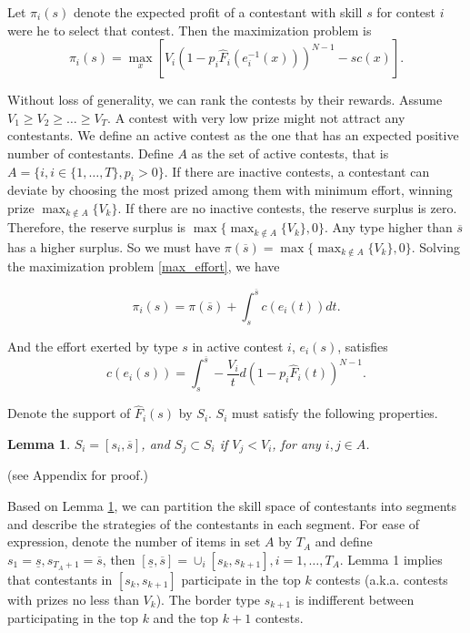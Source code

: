 \documentclass[12pt]{article}
\newtheorem{Lemma}{Lemma}
\begin{document}
Let $\pi_{i}(s)$ denote the expected profit of a contestant with
skill $s$ for contest $i$ were he to select that contest. Then the
maximization problem is
\begin{equation}
\pi_{i}(s)=\max_{x}[V_{i}(1-p_{i}\hat{F}_{i}(e_{i}^{-1}(x)))^{N-1}-sc(x)].\label{max_effort}
\end{equation}


Without loss of generality, we can rank the contests by their rewards.
Assume $V_{1}\geq V_{2}\geq\dots\geq V_{T}$. A contest with very
low prize might not attract any contestants. We define an active contest
as the one that has an expected positive number of contestants. Define
$A$ as the set of active contests, that is $A=\{i,i\in\{1,\dots,T\},p_{i}>0\}$.
If there are inactive contests, a contestant can deviate by choosing
the most prized among them with minimum effort, winning prize $\max_{k\not\in A}\{V_{k}\}$.
If there are no inactive contests, the reserve surplus is zero. Therefore,
the reserve surplus is $\max\{\max_{k\not\in A}\{V_{k}\},0\}$. Any
type higher than $\overline{s}$ has a higher surplus. So we must
have $\pi(\overline{s})=\max\{\max_{k\not\in A}\{V_{k}\},0\}$. Solving
the maximization problem \ref{max_effort}, we have

\begin{equation}
\pi_{i}(s)=\pi(\overline{s})+\int_{s}^{\overline{s}}c(e_{i}(t))dt.\label{profit_s}
\end{equation}

And the effort exerted by type $s$ in active contest $i$, $e_{i}(s)$,
satisfies
\begin{equation}
c(e_{i}(s))=\int_{s}^{\overline{s}}-\frac{V_{i}}{t}d(1-p_{i}\hat{F}_{i}(t))^{N-1}.\label{cost_s}
\end{equation}

Denote the support of $\hat{F}_{i}(s)$ by $S_{i}$. $S_{i}$ must
satisfy the following properties.
\begin{Lemma}\label{sk} $S_{i}=[s_{i},\overline{s}]$,
and $S_{j}\subset S_{i}$ if $V_{j}<V_{i}$, for any $i,j\in A$.
\end{Lemma} (see Appendix for proof.)

Based on Lemma \ref{sk}, we can partition the skill space of contestants into segments and describe the strategies of the contestants in each segment. For ease of expression, denote the number of items in set $A$ by $T_{A}$ and define $s_{1}=\underline{s},s_{T_{A}+1}=\overline{s}$,
then $[\underline{s},\overline{s}]=\cup_{i}[s_{k},s_{k+1}],i=1,\dots,T_{A}$. Lemma 1 implies that contestants in $[s_{k},s_{k+1}]$
participate in the top $k$ contests (a.k.a. contests with prizes no less than $V_{k}$). The border
type $s_{k+1}$ is indifferent between participating in the top $k$ and the
top $k+1$ contests.
\end{document}
